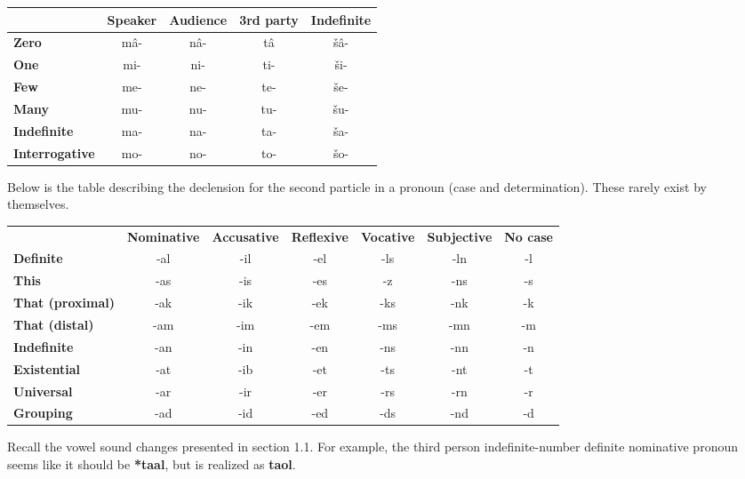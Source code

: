 \documentclass[12pt]{report}
\begin{document}
\begin{tabular}{l | c | c | c | c |}
  & \textbf{Speaker} &  \textbf{Audience} & \textbf{3rd party} & \textbf{Indefinite}\\ \hline
\textbf{Zero} & m\^ a- & n\^ a- & t\^ a & \v s\^ a-\\\hline
\textbf{One} & mi- & ni- &  ti- & \v si-\\\hline
\textbf{Few} & me- & ne- & te- & \v se-\\\hline
\textbf{Many} & mu-&nu-&tu- & \v su-\\\hline
\textbf{Indefinite} & ma- & na- & ta- & \v sa-\\\hline
\textbf{Interrogative} & mo- & no- & to- & \v so-\\\hline
\end{tabular}

\vspace{5mm}

Below is the table describing the declension for the second particle in a pronoun (case and determination). These rarely exist by themselves. 

\vspace{5mm}

\begin{tabular}{l | c | c | c | c | c | c |}
  & \textbf{Nominative} &  \textbf{Accusative} & \textbf{Reflexive} & \textbf{Vocative} & \textbf{Subjective} & \textbf{No case} \\
\textbf{Definite} & -al& -il & -el & -ls & -ln & -l\\
\textbf{This} &-as&  -is & -es & -z & -ns &  -s \\
\textbf{That (proximal)}  & -ak & -ik & -ek&-ks & -nk & -k \\
\textbf{That (distal)} & -am& -im  & -em& -ms& -mn & -m \\
\textbf{Indefinite} & -an& -in & -en& -ns& -nn& -n\\
\textbf{Existential} & -at&  -ib & -et& -ts & -nt &-t\\
\textbf{Universal} & -ar & -ir & -er& -rs& -rn& -r\\
\textbf{Grouping} & -ad& -id & -ed & -ds& -nd & -d\\
\end{tabular}
\vspace{5mm}

Recall the vowel sound changes presented in section 1.1. For example, the third person indefinite-number definite nominative pronoun seems like it should be \textbf{*taal}, but is realized as \textbf{taol}.
\end{document}

